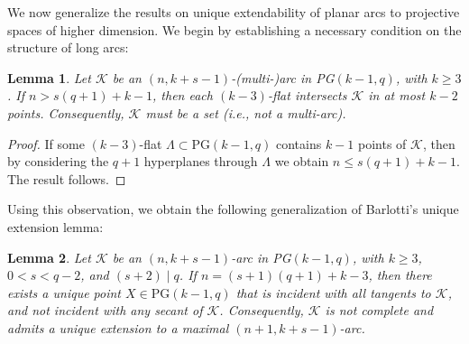 \documentclass[letterpaper, 12pt]{article}
\newtheorem{lemma}{Lemma}
\newcommand{\K}{\mathcal{K}}
\begin{document}
We now generalize the results on unique extendability of planar arcs to projective spaces of higher dimension. We begin by establishing a necessary condition on the structure of long arcs:

\begin{lemma}\label{lem: long implies projective and cap}
	Let \( \K \) be an \((n, k+s-1)\)-(multi-)arc in PG\((k-1, q)\), with \( k \ge 3 \). If \( n > s(q+1) + k - 1 \), then each $(k-3)$-flat intersects $\K$ in at most $k-2$ points. Consequently,  \( \K \) must be a set (i.e., not a multi-arc).
\end{lemma}

 

\begin{proof}
	 If some \((k-3)\)-flat \( \Lambda \subset \text{PG}(k-1,q) \) contains $k-1$ points of $\K$, then by considering the $q+1$ hyperplanes through $\Lambda$ we obtain $n\le s(q+1)+k-1$.  
The result follows.
 \end{proof}


Using this observation, we obtain the following generalization of Barlotti's unique extension lemma:

\begin{lemma}\label{lem: main result}
	Let \( \K \) be an \((n, k + s - 1)\)-arc in PG\((k - 1, q)\), with \( k \ge 3 \), \( 0 < s < q - 2 \), and \( (s+2) \mid q \). If \( n = (s+1)(q+1) + k - 3 \), then there exists a unique point \( X \in \text{PG}(k - 1, q) \) that is incident with all tangents to \( \K \), and not incident with any secant of \( \K \). Consequently, \( \K \) is not complete and admits a unique extension to a maximal \((n + 1, k + s - 1)\)-arc.
\end{lemma}
\end{document}
